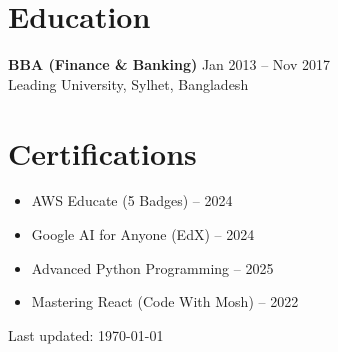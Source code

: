 \documentclass[a4paper,10pt]{article}
\begin{document}
\section*{Education}
\textbf{BBA (Finance \& Banking)} \hfill Jan 2013 – Nov 2017 \\
Leading University, Sylhet, Bangladesh

\section*{Certifications}
\begin{itemize}[leftmargin=*,itemsep=0.5pt]
    \item AWS Educate (5 Badges) – 2024
    \item Google AI for Anyone (EdX) – 2024  
    \item Advanced Python Programming – 2025
    \item Mastering React (Code With Mosh) – 2022
\end{itemize}

\begin{center}
    \vspace{3mm}
    \small Last updated: \today
\end{center}
\end{document}
